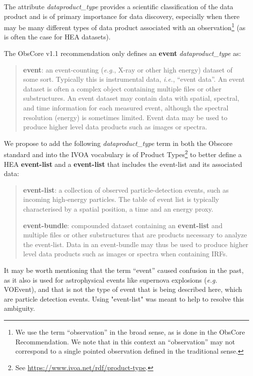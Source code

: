 \documentclass[11pt,a4paper]{ivoa}
\begin{document}
The attribute {\em dataproduct\_type\/} provides a scientific classification of the data product and is of primary importance for data discovery, especially when there may be many different types of data product associated with an observation\footnote{We use the term ``observation'' in the broad sense, as is done in the ObsCore Recommendation. We note that in this context an ``observation'' may not correspond to a single pointed observation defined in the traditional sense.} (as is often the case for \gls{HEA} datasets).

The ObsCore v1.1 recommendation \citep{2017ivoa.spec.0509L} only defines an {\bf event} {\em dataproduct\_type} as:

\begin{quote}
{\bf event}: an event-counting ({\em e.g.\/}, X-ray or other high energy) dataset of some sort. Typically this is instrumental data, {\em i.e.\/}, ``event data''.  An event dataset is often a complex object containing multiple files or other substructures. An event dataset may contain data with spatial, spectral, and time information for each measured event, although the spectral resolution (energy) is sometimes limited. Event data may be used to produce higher level data products such as images or spectra.
\end{quote}

We propose to add the following {\em dataproduct\_type} term in both the Obscore standard and into the \gls{IVOA} vocabulary is of Product Types\footnote{See \url{https://www.ivoa.net/rdf/product-type}.} to better define a \gls{HEA} \textbf{event-list} and a  \textbf{event-list} that includes the event-list and its associated data:

\begin{quote}
{\bf event-list}: a collection of observed particle-detection events, such as incoming high-energy particles. The table of event list is typically characterised by a spatial position, a time and an energy proxy. 

{\bf event-bundle}: compounded dataset containing an {\bf event-list} and multiple files or other substructures that are products necessary to analyze the event-list. Data in an event-bundle may thus be used to produce higher level data products such as images or spectra when containing \glspl{IRF}.
\end{quote}

It may be worth mentioning that the term ``event'' caused confusion in the past, as it also is used for astrophysical events like supernova explosions ({\em e.g.\/} VOEvent), and that is not the type of event that is being described here, which are particle detection events. Using "event-list" was meant to help to resolve this ambiguity.
\end{document}
